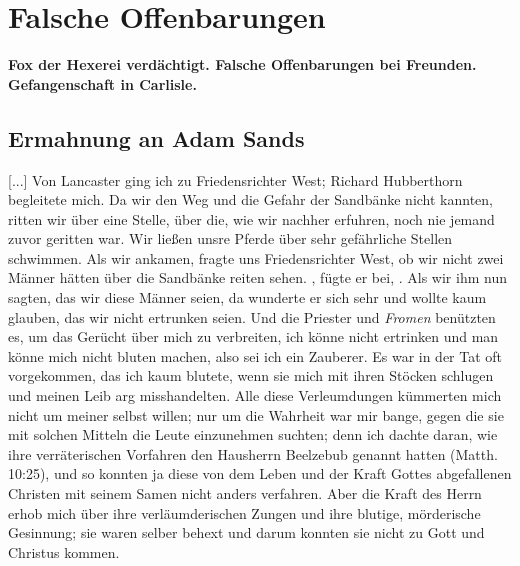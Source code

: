 
\chapter[Falsche Offenbarungen]{Falsche Offenbarungen}

\begin{center}
\textbf{Fox der Hexerei verdächtigt. Falsche Offenbarungen 
bei Freunden. Gefangenschaft in Carlisle.}
\end{center}

\section{Ermahnung an Adam Sands}

[...] Von Lancaster ging ich zu Friedensrichter 
West; Richard
Hubberthorn begleitete mich. 
Da wir den Weg und die Gefahr
der Sandbänke nicht kannten, ritten wir über eine Stelle, über
die, wie wir nachher erfuhren, noch nie jemand zuvor geritten
war. Wir ließen unsre Pferde über sehr gefährliche Stellen
schwimmen. Als wir ankamen, fragte uns Friedensrichter West,
ob wir nicht zwei Männer hätten über die Sandbänke reiten
sehen. , fügte er bei, . Als wir ihm nun sagten, das wir diese Männer seien,
da wunderte er sich sehr und wollte kaum glauben, das wir nicht
ertrunken seien. Und die Priester und \textit{Fromen} benützten es, um
das Gerücht über mich zu verbreiten, ich könne nicht ertrinken und
man könne mich nicht bluten machen, also sei ich ein 
Zauberer.
Es war in der Tat oft vorgekommen, das ich kaum blutete, wenn
sie mich mit ihren Stöcken schlugen und meinen Leib arg 
misshandelten. Alle diese Verleumdungen kümmerten mich nicht um
meiner selbst willen; nur 
um die Wahrheit war mir bange,
gegen die sie mit solchen Mitteln die Leute einzunehmen suchten;
denn ich dachte daran, wie ihre verräterischen Vorfahren den
Hausherrn Beelzebub genannt hatten 
(Matth. 10:25), und so
konnten ja diese von dem Leben und der Kraft Gottes 
abgefallenen Christen mit seinem Samen nicht anders verfahren. Aber
die Kraft des Herrn erhob mich über ihre verläumderischen Zungen
und ihre blutige, mörderische Gesinnung; sie waren selber behext
und darum konnten sie nicht zu Gott und Christus kommen.

